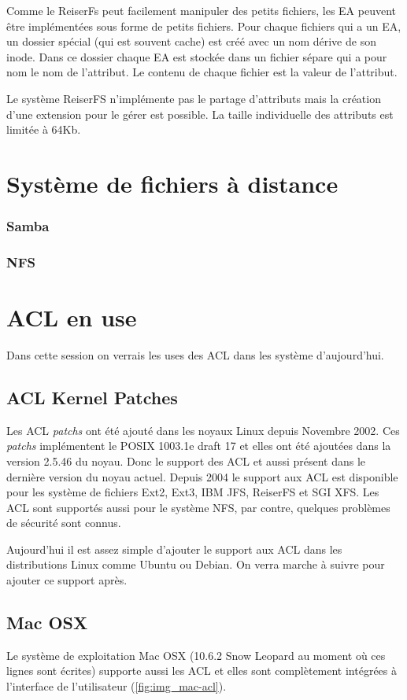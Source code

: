 Comme le ReiserFs peut facilement manipuler des petits fichiers, les EA peuvent être implémentées sous forme de petits fichiers. Pour chaque fichiers qui a un EA, un dossier spécial (qui est souvent cache) est créé avec un nom dérive de son inode. Dans ce dossier chaque EA est stockée dans un fichier sépare qui a pour nom le nom de l'attribut. Le contenu de chaque fichier est la valeur de l'attribut.

Le système ReiserFS n'implémente pas le partage d'attributs mais la création d'une extension pour le gérer est possible. La taille individuelle des attributs est limitée à 64Kb.

\section*{Système de fichiers à distance}
\subsubsection*{Samba}
\subsubsection*{NFS}

\section{ACL en use}

Dans cette session on verrais les uses des ACL dans les système d'aujourd'hui. 

\subsection{ACL Kernel Patches}
Les ACL \emph{patchs} ont été ajouté dans les noyaux Linux depuis Novembre 2002. Ces \emph{patchs} implémentent le POSIX 1003.1e draft 17 et elles ont été ajoutées dans la version 2.5.46 du noyau. Donc le support des ACL et aussi présent dans le dernière version du noyau actuel. Depuis 2004 le support aux ACL est disponible pour les système de fichiers Ext2, Ext3, IBM JFS, ReiserFS et SGI XFS. Les ACL sont supportés aussi pour le système NFS, par contre, quelques problèmes de sécurité sont connus\cite{nfs_problem}. 

Aujourd'hui il est assez simple d'ajouter le support aux ACL dans les distributions Linux comme Ubuntu ou Debian. On verra marche à suivre pour ajouter ce support après.

\subsection{Mac OSX}
Le système de exploitation Mac OSX (10.6.2 Snow Leopard au moment où ces lignes sont écrites) supporte aussi les ACL et elles sont complètement intégrées à l'interface de l'utilisateur (\ref{fig:img_mac-acl}). 

